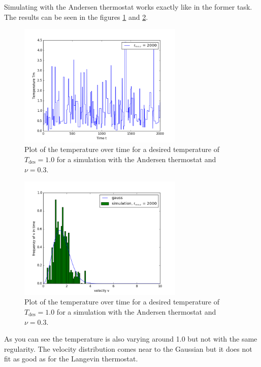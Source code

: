 Simulating with the Andersen thermostat works exactly like in the former task.
The results can be seen in the figures \ref{andersenT} and \ref{andersenvv}.

\begin{figure}[ht]
	\centering
	\includegraphics[width=0.7\textwidth]{../dat/andersen_T1d0_nu0d1_Tm.png}
	\caption{
		Plot of the temperature over time for a desired temperature of $T_\text{des}=1.0$ for a simulation with the Andersen thermostat and $\nu =0.3$.
	}
	\label{andersenT}
\end{figure}

\begin{figure}[ht]
	\centering
	\includegraphics[width=0.7\textwidth]{../dat/andersen_T1d0_nu0d1_vv.png}
	\caption{
		Plot of the temperature over time for a desired temperature of $T_\text{des}=1.0$ for a simulation with the Andersen thermostat and $\nu =0.3$.
	}
	\label{andersenvv}
\end{figure}

As you can see the temperature is also varying around 1.0 but not with the same regularity. 
The velocity distribution comes near to the Gaussian but it does not fit as good as for the Langevin thermostat.

\FloatBarrier 
